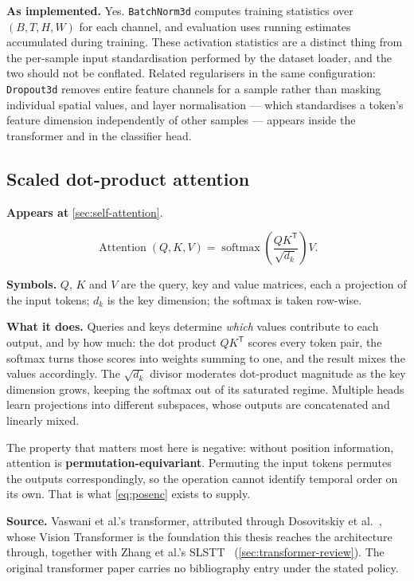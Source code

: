 \textbf{As implemented.} Yes. \texttt{BatchNorm3d} computes training
statistics over $(B,T,H,W)$ for each channel, and evaluation uses running
estimates accumulated during training. These activation statistics are a
distinct thing from the per-sample input standardisation performed by the
dataset loader, and the two should not be conflated. Related regularisers in
the same configuration: \texttt{Dropout3d} removes entire feature channels for
a sample rather than masking individual spatial values, and layer
normalisation --- which standardises a token's feature dimension independently
of other samples --- appears inside the transformer and in the classifier
head.

\subsection{Scaled dot-product attention}
\label{eq:attention}

\textbf{Appears at} \autoref{sec:self-attention}.

\[
    \operatorname{Attention}(Q,K,V)
      =\operatorname{softmax}\left(\frac{QK^{\mathsf T}}{\sqrt{d_k}}\right)V.
\]

\textbf{Symbols.} $Q$, $K$ and $V$ are the query, key and value matrices,
each a projection of the input tokens; $d_k$ is the key dimension; the
softmax is taken row-wise.

\textbf{What it does.} Queries and keys determine \emph{which} values
contribute to each output, and by how much: the dot product $QK^{\mathsf T}$
scores every token pair, the softmax turns those scores into weights summing
to one, and the result mixes the values accordingly. The $\sqrt{d_k}$ divisor
moderates dot-product magnitude as the key dimension grows, keeping the
softmax out of its saturated regime. Multiple heads learn projections into
different subspaces, whose outputs are concatenated and linearly mixed.

The property that matters most here is negative: without position
information, attention is \textbf{permutation-equivariant}. Permuting the
input tokens permutes the outputs correspondingly, so the operation cannot
identify temporal order on its own. That is what
\autoref{eq:posenc} exists to supply.

\textbf{Source.} Vaswani et al.'s transformer, attributed through Dosovitskiy
et al.~\cite{dosovitskiy2021}, whose Vision Transformer is the foundation this
thesis reaches the architecture through, together with Zhang et al.'s
SLSTT~\cite{zhang2022} (\autoref{sec:transformer-review}). The original
transformer paper carries no bibliography entry under the stated policy.

